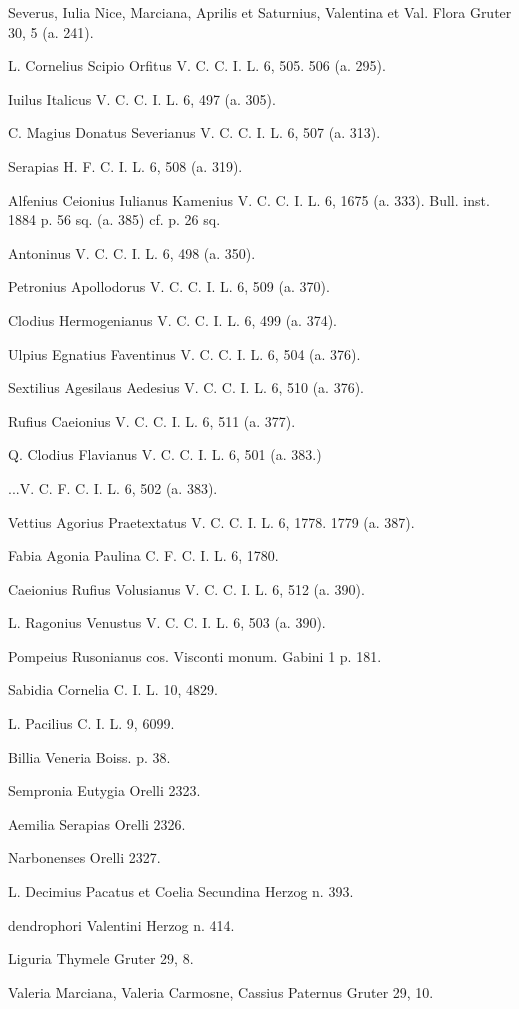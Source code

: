 \documentclass[a4paper, 11pt, oneside, polutonikogreek, german]{article}
\begin{document}
Severus, Iulia Nice, Marciana, Aprilis et Saturnius, Valentina et Val. Flora Gruter 30, 5 (a. 241).

L. Cornelius Scipio Orfitus V. C. C. I. L. 6, 505. 506 (a. 295).

Iuilus Italicus V. C. C. I. L. 6, 497 (a. 305).

C. Magius Donatus Severianus V. C. C. I. L. 6, 507 (a. 313).

Serapias H. F. C. I. L. 6, 508 (a. 319).

Alfenius Ceionius Iulianus Kamenius V. C. C. I. L. 6, 1675 (a. 333). Bull. inst. 1884 p. 56 sq. (a. 385) cf. p. 26 sq.

Antoninus V. C. C. I. L. 6, 498 (a. 350).

Petronius Apollodorus V. C. C. I. L. 6, 509 (a. 370).

Clodius Hermogenianus V. C. C. I. L. 6, 499 (a. 374).

Ulpius Egnatius Faventinus V. C. C. I. L. 6, 504 (a. 376).

Sextilius Agesilaus Aedesius V. C. C. I. L. 6, 510 (a. 376).

Rufius Caeionius V. C. C. I. L. 6, 511 (a. 377).

Q. Clodius Flavianus V. C. C. I. L. 6, 501 (a. 383.)

...V. C. F. C. I. L. 6, 502 (a. 383).

Vettius Agorius Praetextatus V. C. C. I. L. 6, 1778. 1779 (a. 387).

Fabia Agonia Paulina C. F. C. I. L. 6, 1780.

Caeionius Rufius Volusianus V. C. C. I. L. 6, 512 (a. 390).

L. Ragonius Venustus V. C. C. I. L. 6, 503 (a. 390).

Pompeius Rusonianus cos. Visconti monum. Gabini 1 p. 181.

Sabidia Cornelia C. I. L. 10, 4829.

L. Pacilius C. I. L. 9, 6099.

Billia Veneria Boiss. p. 38.

Sempronia Eutygia Orelli 2323.

Aemilia Serapias Orelli 2326.

Narbonenses Orelli 2327.

L. Decimius Pacatus et Coelia Secundina Herzog n. 393.

dendrophori Valentini Herzog n. 414.

Liguria Thymele Gruter 29, 8.

Valeria Marciana, Valeria Carmosne, Cassius Paternus Gruter 29, 10.
\end{document}
